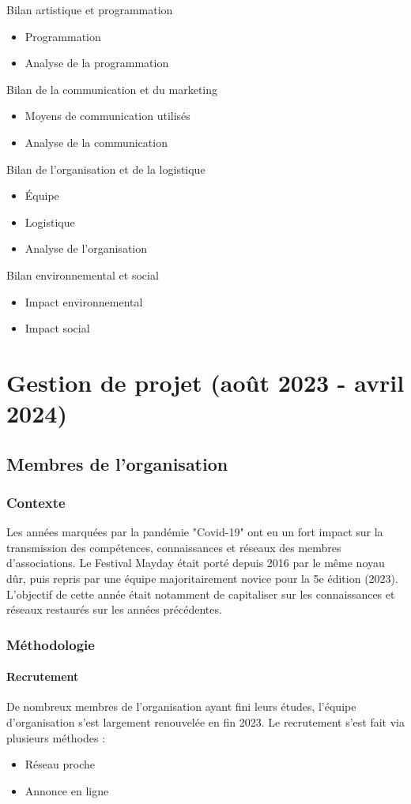 \documentclass[12pt,a4paper,draft]{report}
\begin{document}
Bilan artistique et programmation
\begin{itemize}
\item Programmation
\item Analyse de la programmation
\end{itemize}

Bilan de la communication et du marketing
\begin{itemize}
\item Moyens de communication utilisés
\item Analyse de la communication
\end{itemize}

Bilan de l'organisation et de la logistique
\begin{itemize}
\item Équipe
\item Logistique
\item Analyse de l'organisation
\end{itemize}

Bilan environnemental et social
\begin{itemize}
\item Impact environnemental
\item Impact social
\end{itemize}

\part{Gestion de projet (août 2023 - avril 2024)}
\chapter{Membres de l'organisation}
\section{Contexte}
Les années marquées par la pandémie "Covid-19" ont eu un fort impact sur la transmission des compétences, connaissances et réseaux des membres d'associations. Le Festival Mayday était porté depuis 2016 par le même noyau dûr, puis repris par une équipe majoritairement novice pour la 5e édition (2023). L'objectif de cette année était notamment de capitaliser sur les connaissances et réseaux restaurés sur les années précédentes. 

\section{Méthodologie}
\subsection{Recrutement}
De nombreux membres de l'organisation ayant fini leurs études, l'équipe d'organisation s'est largement renouvelée en fin 2023.
Le recrutement s'est fait via plusieurs méthodes : 
\begin{itemize}
\item Réseau proche
\item Annonce en ligne
\end{itemize}
\end{document}
